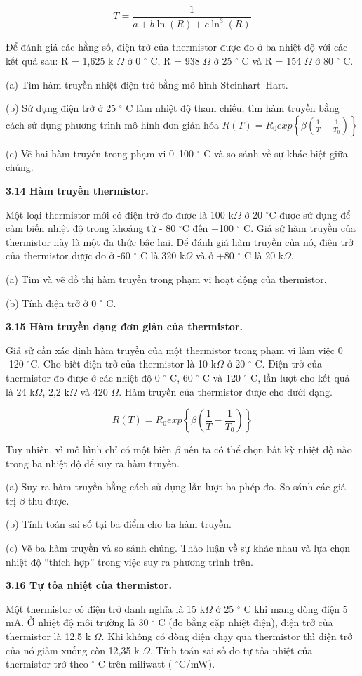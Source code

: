 \documentclass[12pt]{article}
\newcommand{\bt}[1]{\textbf{#1}}
\begin{document}
\[
T=\frac{1}{a+b\ln(R)+c\ln^3(R)}
\]

Để đánh giá các hằng số, điện trở của thermistor được đo ở ba nhiệt độ với các kết quả sau: R = 1,625 k $\Omega$ ở 0 $^\circ$ C, R = 938 $\Omega$ ở 25 $^\circ$ C và R = 154 $\Omega$ ở 80 $^\circ$ C.

(a) Tìm hàm truyền nhiệt điện trở bằng mô hình Steinhart–Hart.

(b) Sử dụng điện trở ở 25 $^\circ$ C làm nhiệt độ tham chiếu, tìm hàm truyền bằng cách sử dụng phương trình mô hình đơn giản hóa $R(T)=R_0exp\left\{\beta\left(\frac{1}{T}-\frac{1}{T_0}\right)\right\}$

(c) Vẽ hai hàm truyền trong phạm vi 0–100 $^\circ$ C và so sánh về sự khác biệt giữa chúng.

\bt{3.14 Hàm truyền thermistor.}

Một loại thermistor mới có điện trở đo được là 100 k$\Omega$ ở 20 $^\circ$C được sử dụng để cảm biến nhiệt độ trong khoảng từ - 80 $^\circ$C đến +100 $^\circ$ C. Giả sử hàm truyền của thermistor này là một đa thức bậc hai. Để đánh giá hàm truyền của nó, điện trở của thermistor được đo ở -60 $^\circ$ C là 320 k$\Omega$ và ở +80 $^\circ$ C là 20 k$\Omega$.

(a) Tìm và vẽ đồ thị hàm truyền trong phạm vi hoạt động của thermistor.

(b) Tính điện trở ở 0 $^\circ$ C.

\bt{3.15 Hàm truyền dạng đơn giản của thermistor.}

Giả sử cần xác định hàm truyền của một thermistor trong phạm vi làm việc 0 -120 $^\circ$C. Cho biết điện trở của thermistor là 10 k$\Omega$ ở 20 $^\circ$ C. Điện trở của thermistor đo được ở các nhiệt độ 0 $^\circ$ C, 60 $^\circ$ C và 120 $^\circ$ C, lần lượt cho kết quả là 24 k$\Omega$, 2,2 k$\Omega$ và 420 $\Omega$. Hàm truyền của thermistor được cho dưới dạng.

\[
R(T)=R_0exp\left\{\beta\left(\frac{1}{T}-\frac{1}{T_0}\right)\right\}
\]

Tuy nhiên, vì mô hình chỉ có một biến $\beta$ nên ta có thể chọn bất kỳ nhiệt độ nào trong ba nhiệt độ để suy ra hàm truyền.

(a) Suy ra hàm truyền bằng cách sử dụng lần lượt ba phép đo. So sánh các giá trị $\beta$ thu được.

(b) Tính toán sai số tại ba điểm cho ba hàm truyền.

(c) Vẽ ba hàm truyền và so sánh chúng. Thảo luận về sự khác nhau và lựa chọn nhiệt độ “thích hợp” trong việc suy ra phương trình trên.

\bt{3.16 Tự tỏa nhiệt của thermistor.}

Một thermistor có điện trở danh nghĩa là 15 k$\Omega$ ở 25 $^\circ$ C khi mang dòng điện 5 mA. Ở nhiệt độ môi trường là 30 $^\circ$ C (đo bằng cặp nhiệt điện), điện trở của thermistor là 12,5 k $\Omega$. Khi không có dòng điện chạy qua thermistor thì điện trở của nó giảm xuống còn 12,35 k $\Omega$. Tính toán sai số do tự tỏa nhiệt của thermistor trở theo $^\circ$ C trên miliwatt ( $^\circ$C/mW).
\end{document}

